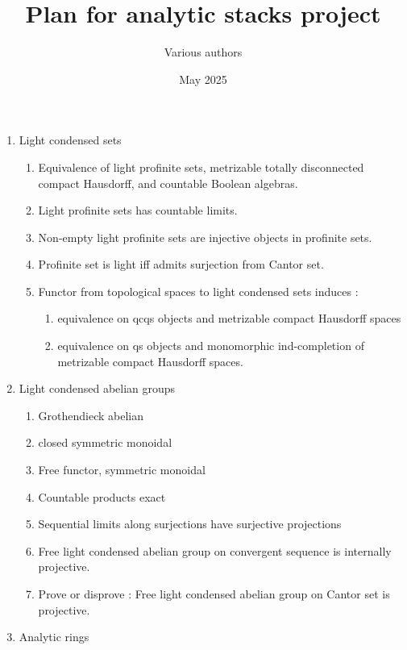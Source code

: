 \documentclass{article}
\title{Plan for analytic stacks project}
\author{Various authors}
\date{May 2025}
\begin{document}
\maketitle

\begin{enumerate}
    \item Light condensed sets
    \begin{enumerate}
        \item Equivalence of light profinite sets,
        metrizable totally disconnected compact Hausdorff,
        and countable Boolean algebras.
        \item Light profinite sets has countable limits.
        \item Non-empty light profinite sets are injective objects in profinite sets.
        \item Profinite set is light iff admits surjection from Cantor set.
        \item Functor from topological spaces to light condensed sets induces : 
        \begin{enumerate}
            \item equivalence on qcqs objects and metrizable compact Hausdorff spaces
            \item equivalence on qs objects and monomorphic ind-completion of
            metrizable compact Hausdorff spaces.
        \end{enumerate}
    \end{enumerate}
    \item Light condensed abelian groups
    \begin{enumerate}
        \item Grothendieck abelian
        \item closed symmetric monoidal
        \item Free functor, symmetric monoidal
        \item Countable products exact
        \item Sequential limits along surjections have surjective projections
        \item Free light condensed abelian group on convergent sequence
        is internally projective.
        \item Prove or disprove : Free light condensed abelian group
        on Cantor set is projective.
    \end{enumerate}
    \item Analytic rings
\end{enumerate}
\end{document}
